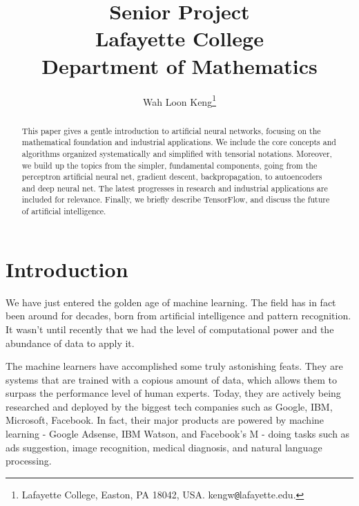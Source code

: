 \documentclass[12pt]{article}  %
\begin{document}
\title{Senior Project\\
Lafayette College \\
Department of Mathematics
}

\author{
{Wah Loon Keng}\thanks{
Lafayette College,
Easton, PA 18042, USA.
kengw{\tt @}lafayette.edu.}
}
\maketitle


\begin{abstract}

This paper gives a gentle introduction to artificial neural networks, focusing on the mathematical foundation and industrial applications. We include the core concepts and algorithms organized systematically and simplified with tensorial notations. Moreover, we build up the topics from the simpler, fundamental components, going from the perceptron artificial neural net, gradient descent, backpropagation, to autoencoders and deep neural net. The latest progresses in research and industrial applications are included for relevance. Finally, we briefly describe TensorFlow, and discuss the future of artificial intelligence.
\end{abstract}


\clearpage
\tableofcontents
\clearpage






\section{Introduction} \label{intro}

We have just entered the golden age of machine learning. The field has in fact been around for decades, born from artificial intelligence and pattern recognition. It wasn't until recently that we had the level of computational power and the abundance of data to apply it. 

The machine learners have accomplished some truly astonishing feats. They are systems that are trained with a copious amount of data, which allows them to surpass the performance level of human experts. Today, they are actively being researched and deployed by the biggest tech companies such as Google, IBM, Microsoft, Facebook. In fact, their major products are powered by machine learning - Google Adsense, IBM Watson, and Facebook's M - doing tasks such as ads suggestion, image recognition, medical diagnosis, and natural language processing.
\end{document}
